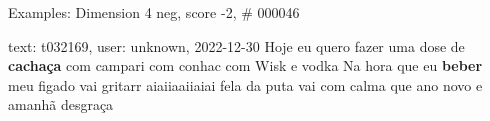 \begin{frame}{Examples: Dimension 4 neg, score -2, \# 000046}
\footnotesize
\begin{alertblock}{text: t032169, user: unknown, 2022-12-30}
Hoje eu quero fazer uma dose de \textbf{cachaça} com campari com conhac com 
Wisk e vodka Na hora que eu \textbf{beber} meu figado vai gritarr aiaiiaaiiaiai 
fela da puta vai com calma que ano novo e amanhã desgraça 
\end{alertblock}
\end{frame}
